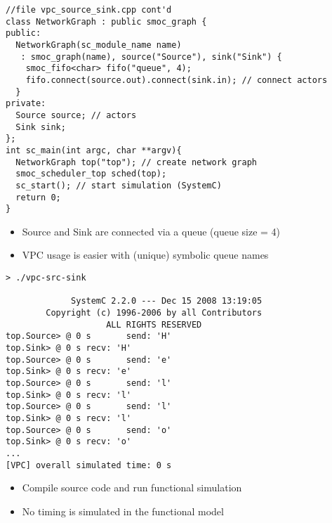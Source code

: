 \begin{frame}[fragile=singleslide]
\begin{lstlisting}
//file vpc_source_sink.cpp cont'd
class NetworkGraph : public smoc_graph {
public:
  NetworkGraph(sc_module_name name)
   : smoc_graph(name), source("Source"), sink("Sink") {
    smoc_fifo<char> fifo("queue", 4);
    fifo.connect(source.out).connect(sink.in); // connect actors
  }
private:
  Source source; // actors
  Sink sink;
};
int sc_main(int argc, char **argv){
  NetworkGraph top("top"); // create network graph
  smoc_scheduler_top sched(top);
  sc_start(); // start simulation (SystemC)
  return 0;
}
\end{lstlisting}
\begin{itemize}
\item Source and Sink are connected via a queue (queue size = 4)
\item VPC usage is easier with (unique) symbolic queue names
\end{itemize}
\end{frame}


\begin{frame}[fragile=singleslide]
\begin{lstlisting}
> ./vpc-src-sink

             SystemC 2.2.0 --- Dec 15 2008 13:19:05
        Copyright (c) 1996-2006 by all Contributors
                    ALL RIGHTS RESERVED            
top.Source> @ 0 s       send: 'H'
top.Sink> @ 0 s recv: 'H'
top.Source> @ 0 s       send: 'e'
top.Sink> @ 0 s recv: 'e'
top.Source> @ 0 s       send: 'l'
top.Sink> @ 0 s recv: 'l'
top.Source> @ 0 s       send: 'l'
top.Sink> @ 0 s recv: 'l'
top.Source> @ 0 s       send: 'o'
top.Sink> @ 0 s recv: 'o'
...
[VPC] overall simulated time: 0 s
\end{lstlisting}
\begin{itemize}
\item Compile source code and run functional simulation
\item No timing is simulated in the functional model
\end{itemize}
\end{frame}


